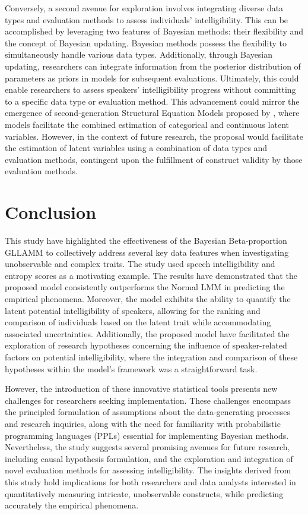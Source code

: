 \documentclass[
  authoryear,
  preprint,
  1p]{elsarticle}
\begin{document}
Conversely, a second avenue for exploration involves integrating diverse
data types and evaluation methods to assess individuals'
intelligibility. This can be accomplished by leveraging two features of
Bayesian methods: their flexibility and the concept of Bayesian
updating. Bayesian methods possess the flexibility to simultaneously
handle various data types. Additionally, through Bayesian updating,
researchers can integrate information from the posterior distribution of
parameters as priors in models for subsequent evaluations. Ultimately,
this could enable researchers to assess speakers' intelligibility
progress without committing to a specific data type or evaluation
method. This advancement could mirror the emergence of second-generation
Structural Equation Models proposed by \citet{Muthen_2001}, where models
facilitate the combined estimation of categorical and continuous latent
variables. However, in the context of future research, the proposal
would facilitate the estimation of latent variables using a combination
of data types and evaluation methods, contingent upon the fulfillment of
construct validity by those evaluation methods.

\section{Conclusion}\label{sec-conclusion}

This study have highlighted the effectiveness of the Bayesian
Beta-proportion GLLAMM to collectively address several key data features
when investigating unobservable and complex traits. The study used
speech intelligibility and entropy scores as a motivating example. The
results have demonstrated that the proposed model consistently
outperforms the Normal LMM in predicting the empirical phenomena.
Moreover, the model exhibits the ability to quantify the latent
potential intelligibility of speakers, allowing for the ranking and
comparison of individuals based on the latent trait while accommodating
associated uncertainties. Additionally, the proposed model have
facilitated the exploration of research hypotheses concerning the
influence of speaker-related factors on potential intelligibility, where
the integration and comparison of these hypotheses within the model's
framework was a straightforward task.

However, the introduction of these innovative statistical tools presents
new challenges for researchers seeking implementation. These challenges
encompass the principled formulation of assumptions about the
data-generating processes and research inquiries, along with the need
for familiarity with probabilistic programming languages (PPLs)
essential for implementing Bayesian methods. Nevertheless, the study
suggests several promising avenues for future research, including causal
hypothesis formulation, and the exploration and integration of novel
evaluation methods for assessing intelligibility. The insights derived
from this study hold implications for both researchers and data analysts
interested in quantitatively measuring intricate, unobservable
constructs, while predicting accurately the empirical phenomena.
\end{document}
